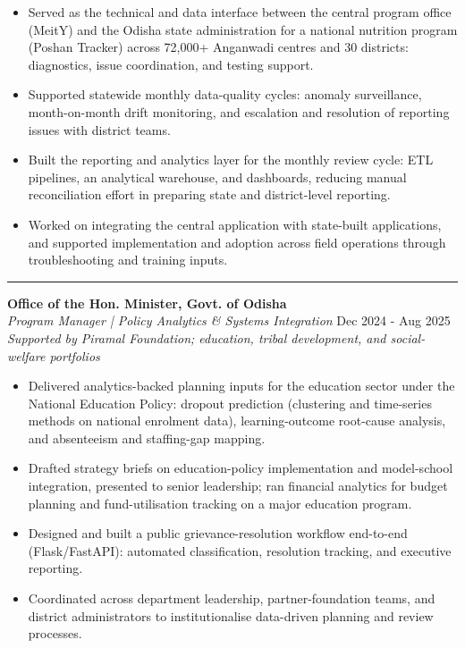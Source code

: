 \documentclass[a4paper,10pt]{article}
\begin{document}
\begin{itemize}
\item Served as the technical and data interface between the central program office (MeitY) and the Odisha state administration for a national nutrition program (Poshan Tracker) across 72,000+ Anganwadi centres and 30 districts: diagnostics, issue coordination, and testing support.
\item Supported statewide monthly data-quality cycles: anomaly surveillance, month-on-month drift monitoring, and escalation and resolution of reporting issues with district teams.
\item Built the reporting and analytics layer for the monthly review cycle: ETL pipelines, an analytical warehouse, and dashboards, reducing manual reconciliation effort in preparing state and district-level reporting.
\item Worked on integrating the central application with state-built applications, and supported implementation and adoption across field operations through troubleshooting and training inputs.
\end{itemize}

\vspace{1pt}

\noindent\rule{\textwidth}{0.15pt}
{\large\textbf{Office of the Hon. Minister, Govt. of Odisha}} \\
\textit{Program Manager | Policy Analytics \& Systems Integration} \hfill {\datefont\small Dec 2024 - Aug 2025} \\
{\small \textit{Supported by Piramal Foundation; education, tribal development, and social-welfare portfolios}}

\begin{itemize}
\item Delivered analytics-backed planning inputs for the education sector under the National Education Policy: dropout prediction (clustering and time-series methods on national enrolment data), learning-outcome root-cause analysis, and absenteeism and staffing-gap mapping.
\item Drafted strategy briefs on education-policy implementation and model-school integration, presented to senior leadership; ran financial analytics for budget planning and fund-utilisation tracking on a major education program.
\item Designed and built a public grievance-resolution workflow end-to-end (Flask/FastAPI): automated classification, resolution tracking, and executive reporting.
\item Coordinated across department leadership, partner-foundation teams, and district administrators to institutionalise data-driven planning and review processes.
\end{itemize}
\end{document}
